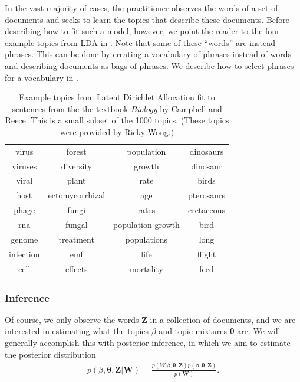In the vast majority of cases, the practitioner observes the words of
a set of documents and seeks to learn the topics that describe these
documents.  Before describing how to fit such a model, however, we
point the reader to the four example topics from LDA in
.  Note that some of these ``words'' are
instead phrases.  This can be done by creating a vocabulary of phrases
instead of words and describing documents as bags of phrases.  We
describe how to select phrases for a vocabulary in
.
\begin{table}
  \caption{Example topics from Latent Dirichlet Allocation fit to sentences from the the textbook \emph{Biology} by Campbell and Reece.  This is a small subset of the 1000 topics. (These topics were provided by Ricky Wong.)}
  \center  \begin{tabular}{|c|c|c|c|}
    \hline
    virus & forest & population & dinosaurs \\
    viruses & diversity & growth & dinosaur \\
    viral & plant & rate & birds \\
    host & ectomycorrhizal & age & pterosaurs \\
    phage & fungi & rates & cretaceous \\
    rna & fungal & population growth & bird \\
    genome & treatment & populations & long \\
    infection & emf & life & flight \\
    cell & effects & mortality & feed \\
    \hline
  \end{tabular}
  \label{fig:example_lda_topics}
\end{table}

\subsubsection{Inference}
Of course, we only observe the words $\bm Z$ in a collection of
documents, and we are interested in estimating what the topics $\beta$
and topic mixtures $\bm \theta$ are.  We will generally accomplish this
with posterior inference, in which we aim to estimate the posterior
distribution
\begin{align}
  p(\beta, \bm \theta, \bm Z | \bm W) = \frac{p(W | \beta, \bm \theta, \bm Z) p(\beta, \bm \theta, \bm Z)}{p(\bm W)}.
\end{align}

